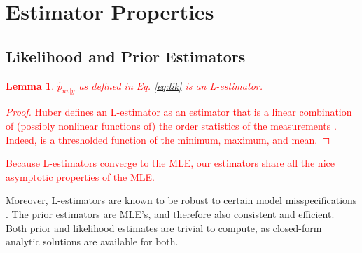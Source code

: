 \documentclass[10pt,journal,cspaper,compsoc]{IEEEtran}
\providecommand{\tr}[1]{\textcolor{red}{#1}}
\providecommand{\wh}[1]{\widehat{#1}}
\newcommand{\conv}{\rightarrow}
\newtheorem{Lem}{Lemma}[section]
\begin{document}
\section{Estimator Properties} %
\label{sec:results}

% 

\subsection{Likelihood and Prior Estimators} %
\label{ssub:subsubsection_name4}

\tr{
\begin{Lem}
	$\wh{p}_{uv|y}$ as defined in Eq. \eqref{eq:lik}  is an L-estimator.
\end{Lem}
% 
\begin{proof}
Huber defines an L-estimator as an estimator that is a linear combination of (possibly nonlinear functions of) the order statistics of the measurements \cite{Huber1981}.  Indeed, is a thresholded function of the minimum, maximum, and mean.
\end{proof}
% 
Because L-estimators converge to the MLE, our estimators share all the nice asymptotic properties of the MLE.  }
% 
% 
Moreover, L-estimators are known to be robust to certain model misspecifications \cite{Huber1981}. The prior estimators are MLE's, and therefore also consistent and efficient.
% 
% 
% 
Both prior and likelihood estimates are trivial to compute, as closed-form analytic solutions are available for both.  %
\end{document}
